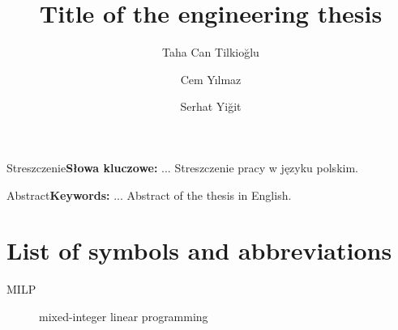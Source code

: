 \documentclass[english]{fem_thesis}
\title{Title of the engineering thesis}
\author{%
  Taha Can Tilkioğlu \album{000000} \and
  Cem Yılmaz \album{000000} \and
  Serhat Yiğit \album{000000}}
\begin{document}
\femtitlepage

\tableofcontents*
\clearpage

\begin{femabstractpl}{Streszczenie}{\textbf{Słowa kluczowe:} ...}
Streszczenie pracy w języku polskim.
\end{femabstractpl}

\begin{femabstract}{Abstract}{\textbf{Keywords:} ...}
Abstract of the thesis in English.
\end{femabstract}

\chapter*{List of symbols and abbreviations}
\begin{description}
  \item[MILP] mixed-integer linear programming
\end{description}








\femreferences

\listoftables
\listoffigures
\listofappendices

\femappendices
{}

\end{document}
